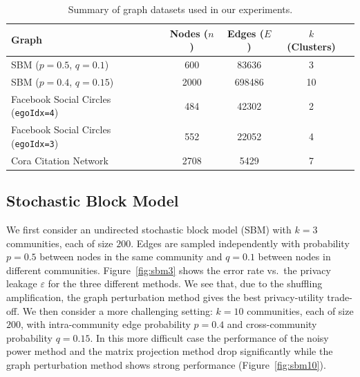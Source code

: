\documentclass[11pt]{article}
\theoremstyle{plain}
\theoremstyle{definition}
\theoremstyle{remark}
\begin{document}
\begin{table}[h!]
\centering
\caption{Summary of graph datasets used in our experiments.}
\label{tab:datasets}
\begin{tabular}{lcccc}
\toprule
\textbf{Graph} & \textbf{Nodes ($n$)} & \textbf{Edges ($E$)} & \textbf{$k$ (Clusters)} \\
\midrule
SBM ($p=0.5$, $q=0.1$) & 600 & 83636 & 3 \\ %
SBM ($p=0.4$, $q=0.15$) & 2000 & 698486 & 10 \\ %
Facebook Social Circles (\verb|egoIdx=4|) & 484 & 42302 & 2 \\%
Facebook Social Circles (\verb|egoIdx=3|) & 552 & 22052 & 4 \\%
Cora Citation Network  & 2708 & 5429 & 7 \\ %
\bottomrule
\end{tabular}
\end{table}

\subsection{Stochastic Block Model}

We first consider an undirected stochastic block model (SBM) with $k=3$ communities, each of size $200$. Edges are sampled independently with probability $p=0.5$ between nodes in the same community and $q=0.1$ between nodes in  different communities.
Figure~\ref{fig:sbm3} shows the error rate vs.\ the privacy leakage 
$\varepsilon$  for the three different methods.  We see that, due to the shuffling amplification, the graph perturbation  method gives the best privacy-utility trade-off. %
We then consider a more challenging setting: $k=10$ communities, each of size $200$, with intra-community edge probability $p=0.4$ and cross-community probability $q=0.15$. In this more difficult case the performance of the noisy power method and the matrix projection method drop significantly while the graph perturbation method shows strong performance (Figure~\ref{fig:sbm10}).
\end{document}
